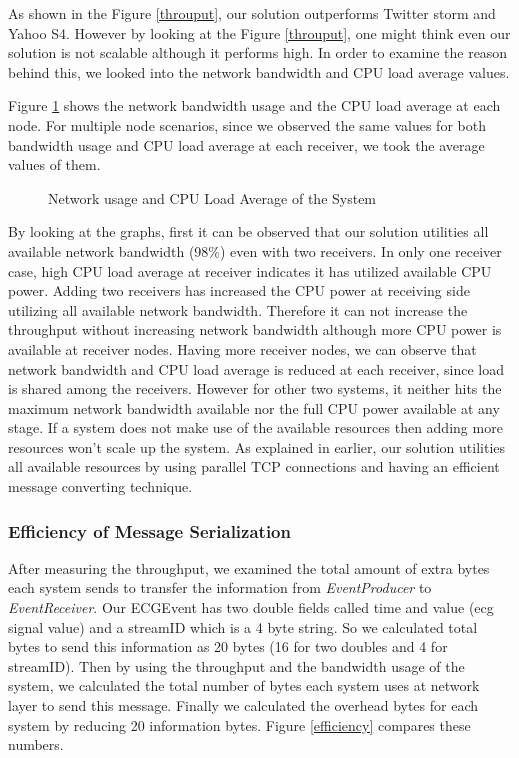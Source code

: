As shown in the Figure \ref{throuput}, our solution outperforms Twitter storm\cite{twitterStorm} and Yahoo S4\cite{neumeyer2010s4}. However by looking at the Figure \ref{throuput}, one might think even our solution is not scalable although it performs high. In order to examine the reason behind this, we looked into the network bandwidth and CPU load average values. 
 
Figure \ref{networkandload} shows the network bandwidth usage and the CPU load average at each node. For multiple node scenarios, since we observed the same values for both bandwidth usage and CPU load average at each receiver, we took the average values of them. 

\begin{figure}[!t]
	\centering
	\hfil
	\caption{Network usage and CPU Load Average of the System}
	\label{networkandload}
\end{figure}
 

By looking at the graphs, first it can be observed that our solution utilities all available network bandwidth (98\%) even with two receivers. In only one receiver case, high CPU load average at receiver indicates it has utilized available CPU power. Adding two receivers has increased the CPU power at receiving side utilizing all available network bandwidth. Therefore it can not increase the throughput without increasing network bandwidth although more CPU power is available at receiver nodes. Having more receiver nodes, we can observe that network bandwidth and CPU load average is reduced at each receiver, since load is shared among the receivers. However for other two systems, it neither hits the maximum network bandwidth available nor the full CPU power available at any stage. If a system does not make use of the available resources then adding more resources won't scale up the system. As explained in earlier, our solution utilities all available resources by using parallel TCP connections and having an efficient 
message converting technique.

\subsubsection{Efficiency of Message Serialization}
After measuring the throughput, we examined the  total amount of extra bytes each system sends to transfer the information from \textit{EventProducer} to \textit{EventReceiver}. Our ECGEvent has two double fields called time and value (ecg signal value) and a streamID which is a 4 byte string. So we calculated total bytes to send this information as 20 bytes (16 for two doubles and 4 for streamID). Then by using the throughput and the bandwidth usage of the system, we calculated the total number of bytes each system uses at network layer to send this message. Finally we calculated the overhead bytes for each system by reducing 20 information bytes. Figure \ref{efficiency} compares these numbers.

